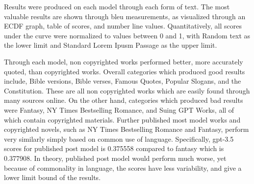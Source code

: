 \documentclass{article}
\begin{document}




Results were produced on each model through each form of text. The most valuable results are shown through bleu measurements, as visualized through an ECDF graph, table of scores, and number line values. Quantitatively, all scores under the curve were normalized to values between 0 and 1, with Random text as the lower limit and Standard Lorem Ipusm Passage as the upper limit.  

Through each model, non copyrighted works performed better, more accurately quoted, than copyrighted works. Overall categories which produced good results include, Bible versions, Bible verses, Famous Quotes, Popular Slogans, and the Constitution. These are all non copyrighted works which are easily found through many sources online. On the other hand, categories which produced bad results were Fantasy, NY Times Bestselling Romance, and Suing GPT Works, all of which contain copyrighted materials. Further published most model works and copyrighted novels, such as NY Times Bestselling Romance and Fantasy, perform very similarly simply based on common use of language. Specifically, gpt-3.5 scores for published post model is 0.375558 compared to fantasy which is 0.377908. In theory, published post model would perform much worse, yet because of commonality in language, the scores have less variability, and give a lower limit bound of the results. 
\end{document}
